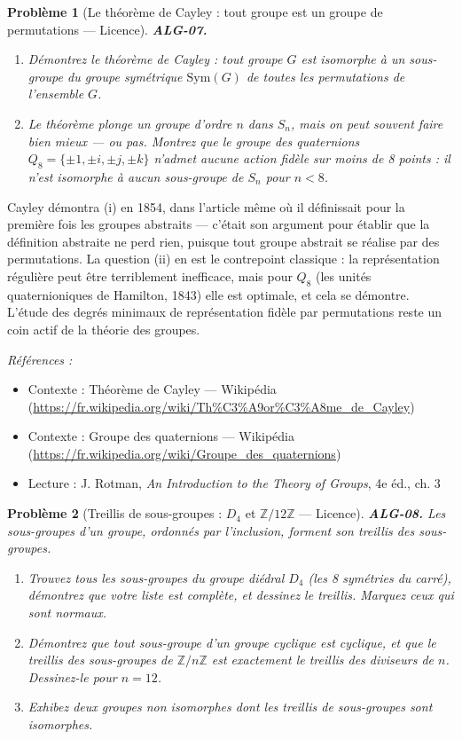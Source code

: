 \documentclass[11pt]{article}
\newtheorem{problem}{Problème}
\newenvironment{refs}{\par\small\noindent\emph{Références :}\begin{itemize}\setlength\itemsep{0pt}}{\end{itemize}\normalsize}
\begin{document}
\begin{problem}[{Le théorème de Cayley : tout groupe est un groupe de permutations --- Licence}]
\textbf{ALG-07.} \begin{enumerate}
\item[(i)] Démontrez le théorème de Cayley : tout groupe $G$ est isomorphe
à un sous-groupe du groupe symétrique $\mathrm{Sym}(G)$ de toutes les permutations de l'ensemble $G$.
\item[(ii)] Le théorème plonge un groupe d'ordre $n$ dans $S_n$, mais on peut souvent faire bien mieux ---
ou pas. Montrez que le groupe des quaternions $Q_8 = \{\pm 1, \pm i, \pm j, \pm k\}$ n'admet aucune
action fidèle sur moins de 8 points : il n'est isomorphe à aucun sous-groupe de $S_n$ pour
$n < 8$.
\end{enumerate}

\end{problem}

\noindent Cayley démontra (i) en 1854, dans l'article même où il définissait pour la première fois les
groupes abstraits --- c'était son argument pour établir que la définition abstraite ne perd rien, puisque tout
groupe abstrait se réalise par des permutations. La question (ii) en est le contrepoint classique : la
représentation régulière peut être terriblement inefficace, mais pour $Q_8$ (les unités quaternioniques de
Hamilton, 1843) elle est optimale, et cela se démontre. L'étude des degrés minimaux de représentation fidèle
par permutations reste un coin actif de la théorie des groupes.

\begin{refs}
\item Contexte : Théorème de Cayley --- Wikipédia (\url{https://fr.wikipedia.org/wiki/Th%C3%A9or%C3%A8me_de_Cayley})
\item Contexte : Groupe des quaternions --- Wikipédia (\url{https://fr.wikipedia.org/wiki/Groupe_des_quaternions})
\item Lecture : J. Rotman, \textit{An Introduction to the Theory of Groups}, 4e éd., ch. 3
\end{refs}

\bigskip

\begin{problem}[{Treillis de sous-groupes : $D_4$ et $\mathbb{Z}/12\mathbb{Z}$ --- Licence}]
\textbf{ALG-08.} Les sous-groupes d'un groupe, ordonnés par l'inclusion, forment son
\textit{treillis des sous-groupes}.
\begin{enumerate}
\item[(i)] Trouvez tous les sous-groupes du groupe diédral $D_4$ (les 8 symétries
du carré), démontrez que votre liste est complète, et dessinez le treillis. Marquez ceux qui sont
normaux.
\item[(ii)] Démontrez que tout sous-groupe d'un groupe cyclique est cyclique, et que le treillis des
sous-groupes de $\mathbb{Z}/n\mathbb{Z}$ est exactement le treillis des diviseurs de $n$. Dessinez-le pour
$n = 12$.
\item[(iii)] Exhibez deux groupes non isomorphes dont les treillis de sous-groupes sont isomorphes.
\end{enumerate}

\end{problem}
\end{document}
